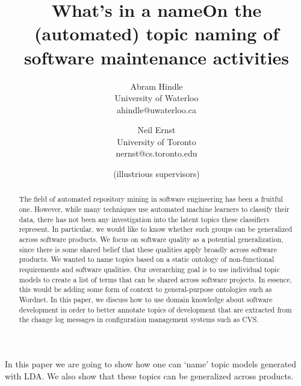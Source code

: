 \documentclass[times, 10pt,twocolumn]{article}
\begin{document}
\title{What's in a nameOn the (automated) topic naming of software maintenance activities}

\author{Abram Hindle\\
University of Waterloo\\ 
ahindle@uwaterloo.ca\\
\and
Neil Ernst\\
University of Toronto\\ 
nernst@cs.toronto.edu\\

\and
(illustrious supervisors)\\
}

\maketitle
\thispagestyle{empty}

\begin{abstract}
  The field of automated repository mining in software engineering has
  been a fruitful one. However, while many techniques use automated
  machine learners to classify their data, there has not been any
  investigation into the latent topics these classifiers represent. In
  particular, we would like to know whether such groups can be
  generalized across software products. We focus on software quality
  as a potential generalization, since there is some shared belief
  that these qualities apply broadly across software products. We
  wanted to name topics based on a static ontology of non-functional
  requirements and software qualities. Our overarching goal is to use
  individual topic models to create a list of terms that can be shared
  across software projects. In essence, this would be adding some form
  of context to general-purpose ontologies such as Wordnet. In this
  paper, we discuss how to use domain knowledge about software
  development in order to better annotate topics of development that
  are extracted from the change log messages in configuration
  management systems such as CVS.
\end{abstract}



In this paper we are going to show how one can `name' topic models
generated with LDA. We also show that these topics can be generalized
across products.
\end{document}
